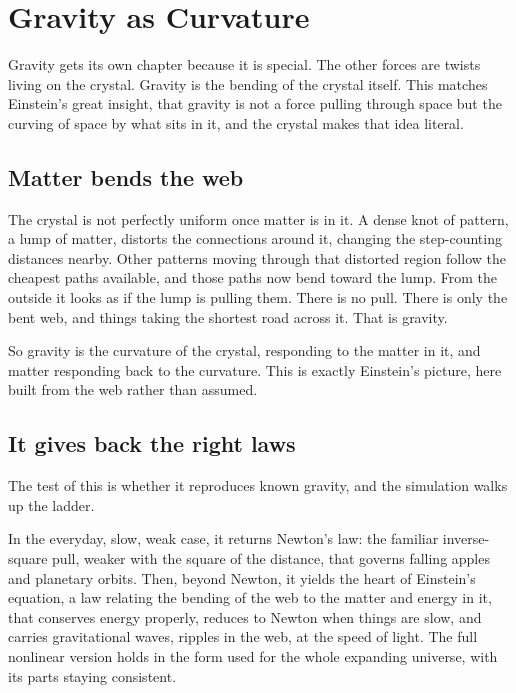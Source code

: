 \section{Gravity as Curvature}

Gravity gets its own chapter because it is special. The other forces are twists living on the crystal. Gravity is the bending of the crystal itself. This matches Einstein's great insight, that gravity is not a force pulling through space but the curving of space by what sits in it, and the crystal makes that idea literal.

\subsection{Matter bends the web}

The crystal is not perfectly uniform once matter is in it. A dense knot of pattern, a lump of matter, distorts the connections around it, changing the step-counting distances nearby. Other patterns moving through that distorted region follow the cheapest paths available, and those paths now bend toward the lump. From the outside it looks as if the lump is pulling them. There is no pull. There is only the bent web, and things taking the shortest road across it. That is gravity.

So gravity is the curvature of the crystal, responding to the matter in it, and matter responding back to the curvature. This is exactly Einstein's picture, here built from the web rather than assumed.

\subsection{It gives back the right laws}

The test of this is whether it reproduces known gravity, and the simulation walks up the ladder.

In the everyday, slow, weak case, it returns Newton's law: the familiar inverse-square pull, weaker with the square of the distance, that governs falling apples and planetary orbits. Then, beyond Newton, it yields the heart of Einstein's equation, a law relating the bending of the web to the matter and energy in it, that conserves energy properly, reduces to Newton when things are slow, and carries gravitational waves, ripples in the web, at the speed of light. The full nonlinear version holds in the form used for the whole expanding universe, with its parts staying consistent.

